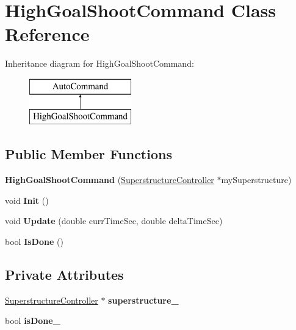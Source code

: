 \hypertarget{class_high_goal_shoot_command}{}\section{High\+Goal\+Shoot\+Command Class Reference}
\label{class_high_goal_shoot_command}
Inheritance diagram for High\+Goal\+Shoot\+Command\+:\begin{figure}[H]
\begin{center}
\leavevmode
\includegraphics[height=2.000000cm]{class_high_goal_shoot_command}
\end{center}
\end{figure}
\subsection*{Public Member Functions}
\begin{DoxyCompactItemize}
\item 
\mbox{\label{class_high_goal_shoot_command_a3e6281bd69c1ba42b2b55a8fe7a47381}} 
{\bfseries High\+Goal\+Shoot\+Command} (\hyperlink{class_superstructure_controller}{Superstructure\+Controller} $\ast$my\+Superstructure)
\item 
\mbox{\label{class_high_goal_shoot_command_a8268066dc4809492290a88a5f65e277d}} 
void {\bfseries Init} ()
\item 
\mbox{\label{class_high_goal_shoot_command_afa9e819bb0c0ae3ed8d47d67af95ed2e}} 
void {\bfseries Update} (double curr\+Time\+Sec, double delta\+Time\+Sec)
\item 
\mbox{\label{class_high_goal_shoot_command_a4a193b798e8ec374abcae6b33b974e1d}} 
bool {\bfseries Is\+Done} ()
\end{DoxyCompactItemize}
\subsection*{Private Attributes}
\begin{DoxyCompactItemize}
\item 
\mbox{\label{class_high_goal_shoot_command_ab652d73c7e2968cf1b340edf1fd3b3e1}} 
\hyperlink{class_superstructure_controller}{Superstructure\+Controller} $\ast$ {\bfseries superstructure\+\_\+}
\item 
\mbox{\label{class_high_goal_shoot_command_aef45a8845bd90a878398abd5b4c8a5cb}} 
bool {\bfseries is\+Done\+\_\+}
\end{DoxyCompactItemize}


